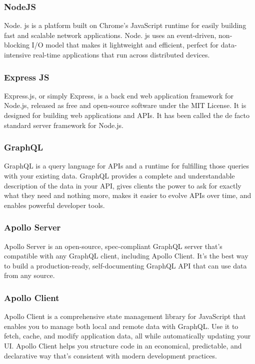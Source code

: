     \subsubsection{NodeJS}
    Node. js is a platform built on Chrome's JavaScript runtime for easily building fast and scalable network applications. 
    Node. js uses an event-driven, non-blocking I/O model that makes it lightweight and efficient, perfect for data-intensive 
    real-time applications that run across distributed devices.

    \subsubsection{Express JS}
    Express.js, or simply Express, is a back end web application framework for Node.js, released as free and open-source software under the MIT License. 
    It is designed for building web applications and APIs.
    It has been called the de facto standard server framework for Node.js.

    \subsubsection{GraphQL}
    GraphQL is a query language for APIs and a runtime for fulfilling those queries with your existing data. 
    GraphQL provides a complete and understandable description of the data in your API, gives clients the power to ask for exactly what they need and nothing more, 
    makes it easier to evolve APIs over time, and enables powerful developer tools.

    \subsubsection{Apollo Server}
    Apollo Server is an open-source, spec-compliant GraphQL server that's compatible with any GraphQL client, including Apollo Client. 
    It's the best way to build a production-ready, self-documenting GraphQL API that can use data from any source.

    \subsubsection{Apollo Client}
    Apollo Client is a comprehensive state management library for JavaScript that enables you to manage both local and remote data with GraphQL.
    Use it to fetch, cache, and modify application data, all while automatically updating your UI.
    Apollo Client helps you structure code in an economical, predictable, and declarative way that's consistent with modern development practices. 


